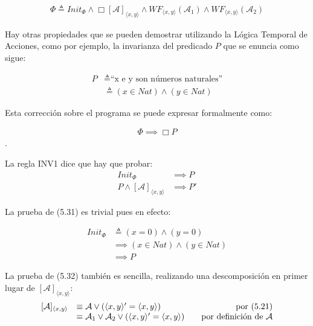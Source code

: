 \begin{align}
    \Phi \triangleq Init_{\Phi} \land \Box [\mathcal{A}]_{\langle x,y \rangle} \land WF_{\langle x,y \rangle}(\mathcal{A}_1) \land WF_{\langle x,y \rangle}(\mathcal{A}_2)
\end{align}

Hay otras propiedades que se pueden demostrar utilizando la Lógica Temporal de Acciones, como por ejemplo, la invarianza del predicado $P$ que se enuncia como sigue:

\begin{align}
    P &\triangleq \text{``x e y son números naturales''} \\
    &\triangleq (x \in Nat) \land (y \in Nat)
\end{align}

\noindent
Esta corrección sobre el programa se puede expresar formalmente como:

\begin{align}
    \Phi \implies \Box P
\end{align}. 

\noindent
La regla INV1 dice que hay que probar:
\begin{align}
    Init_{\Phi} &\implies P \\
    P \land [\mathcal{A}]_{\langle x,y \rangle} &\implies P'
\end{align}

\noindent
La prueba de (5.31) es trivial pues en efecto:

\begin{align*}
    Init_{\Phi} &\triangleq (x = 0) \land (y = 0) \\
    &\implies (x \in Nat) \land (y \in Nat) \\
    &\implies P
\end{align*}
 
La prueba de (5.32) también es sencilla, realizando una descomposición en primer lugar de $[\mathcal{A}]_{\langle x,y \rangle}$:
\begin{equation*}
\begin{array}{rlr}
    [\mathcal{A}]_{\langle x,y \rangle} &\equiv \mathcal{A} \lor (\langle x,y \rangle' = \langle x,y \rangle) & \quad \text{por (5.21)}\\
    &\equiv \mathcal{A}_1 \lor \mathcal{A}_2 \lor (\langle x,y \rangle' = \langle x,y \rangle) & \quad \text{por definición de $ \mathcal{A}$}
\end{array}
\end{equation*}

